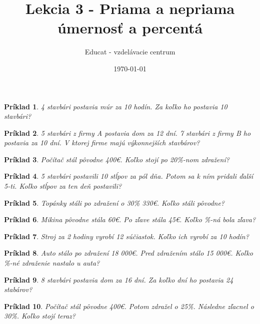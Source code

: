 \documentclass{article}
\title{Lekcia 3 - Priama a nepriama úmernosť a percentá}
\date{\today}
\author{Educat - vzdelávacie centrum}
\newtheorem{example}{Príklad}
\begin{document}
	\maketitle
	
	\begin{example}
		4 stavbári postavia múr za 10 hodín. Za koľko ho postavia 10 stavbári?
	\end{example}
	
	\begin{example}
		5 stavbári z firmy A postavia dom za 12 dní. 7 stavbári z firmy B ho postavia za 10 dní. V ktorej firme majú výkonnejších stavbárov? 
	\end{example}
	
	\begin{example}
		Počítač stál pôvodne 400€. Koľko stojí po 20\%-nom zdražení?
	\end{example}
	
	\begin{example}
		5 stavbári postavili 10 stĺpov za pól dňa. Potom sa k ním pridali ďalší 5-ti. Koľko stĺpov za ten deň postavili?
	\end{example}
	
	\begin{example}
		Topánky stáli po zdražení o 30\% 330€. Koľko stáli pôvodne?
	\end{example}
	
	\begin{example}
		Mikina pôvodne stála 60€. Po zľave stála 45€. Koľko \%-ná bola zľava?
	\end{example}
	
	\begin{example}
		Stroj za 2 hodiny vyrobí 12 súčiastok. Koľko ich vyrobí za 10 hodín?
	\end{example}
	
	\begin{example}
		Auto stálo po zdražení 18 000€. Pred zdražením stálo 15 000€. Koľko \%-né zdraženie nastalo u auta?
	\end{example}
	
	\begin{example}
		8 stavbári postavia dom za 16 dní. Za koľko dní ho postavia 24 stabárov?
	\end{example}
	
	\begin{example}
		Počítač stál pôvodne 400€. Potom zdražel o 25\%. Následne zľacnel o 30\%. Koľko stojí teraz?
	\end{example}
	
\end{document}
